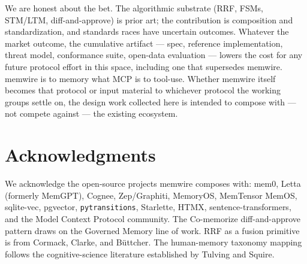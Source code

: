 \documentclass[11pt,letterpaper,twocolumn]{article}
\begin{document}
We are honest about the bet. The algorithmic substrate (RRF, FSMs, STM/LTM, diff-and-approve) is prior art; the contribution is composition and standardization, and standards races have uncertain outcomes. Whatever the market outcome, the cumulative artifact --- spec, reference implementation, threat model, conformance suite, open-data evaluation --- lowers the cost for any future protocol effort in this space, including one that supersedes memwire. memwire is to memory what MCP is to tool-use. Whether memwire itself becomes that protocol or input material to whichever protocol the working groups settle on, the design work collected here is intended to compose with --- not compete against --- the existing ecosystem.

\section*{Acknowledgments}

We acknowledge the open-source projects memwire composes with: mem0, Letta (formerly MemGPT), Cognee, Zep/Graphiti, MemoryOS, MemTensor MemOS, sqlite-vec, pgvector, \texttt{pytransitions}, Starlette, HTMX, sentence-transformers, and the Model Context Protocol community. The Co-memorize diff-and-approve pattern draws on the Governed Memory line of work. RRF as a fusion primitive is from Cormack, Clarke, and B{\"u}ttcher. The human-memory taxonomy mapping follows the cognitive-science literature established by Tulving and Squire.



\end{document}
